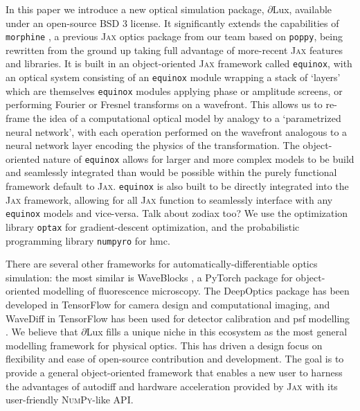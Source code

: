 \documentclass[]{spieman}
\newcommand\jax{\textsc{Jax}\xspace}
\newcommand\dlux{$\partial$Lux\xspace}
\newcommand\equinox{\texttt{equinox}\xspace}
\newcommand\optax{\texttt{optax}\xspace}
\newcommand\numpyro{\texttt{numpyro}\xspace}
\begin{document}
In this paper we introduce a new optical simulation package, \dlux, available under an open-source BSD 3 license. It significantly extends the capabilities of \texttt{morphine} \cite{pope2021,phase_ret_and_design}, a previous \jax optics package from our team based on \texttt{poppy}, being rewritten from the ground up taking full advantage of more-recent \jax features and libraries.  It is built in an object-oriented \jax framework called \equinox \cite{kidger2021equinox}, with an optical system consisting of an \equinox module wrapping a stack of `layers' which are themselves \equinox modules applying phase or amplitude screens, or performing Fourier or Fresnel transforms on a wavefront. This allows us to re-frame the idea of a computational optical model by analogy to a `parametrized neural network', with each operation performed on the wavefront analogous to a neural network layer encoding the physics of the transformation. The object-oriented nature of \equinox allows for larger and more complex models to be build and seamlessly integrated than would be possible within the purely functional framework default to \jax. \equinox is also built to be directly integrated into the \jax framework, allowing for all \jax function to seamlessly interface with any \equinox models and vice-versa. Talk about zodiax too? We use the optimization library \optax \cite{optax2020github} for gradient-descent optimization, and the probabilistic programming library \numpyro \cite{Phan2019} for \ac{hmc}.

There are several other frameworks for automatically-differentiable optics simulation:
the most similar is WaveBlocks \cite{page2020}, a PyTorch package for object-oriented modelling of fluorescence microscopy. 
The DeepOptics package \cite{sitzmann2018} has been developed in TensorFlow for camera design and computational imaging, and
WaveDiff in TensorFlow has been used for detector calibration \cite{liaudat2021} and \ac{psf} modelling \cite{Liaudat2022}. 
We believe that \dlux fills a unique niche in this ecosystem as the most general modelling framework for physical optics. This has driven a design focus on flexibility and ease of open-source contribution and development. The goal is to provide a general object-oriented framework that enables a new user to harness the advantages of autodiff and hardware acceleration provided by \jax with its user-friendly \textsc{NumPy}-like API.

\end{document}
